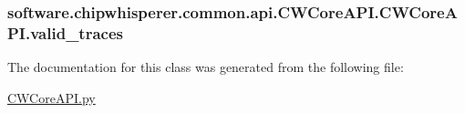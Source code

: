 \subsubsection[{valid\+\_\+traces}]{\setlength{\rightskip}{0pt plus 5cm}software.\+chipwhisperer.\+common.\+api.\+C\+W\+Core\+A\+P\+I.\+C\+W\+Core\+A\+P\+I.\+valid\+\_\+traces}\label{classsoftware_1_1chipwhisperer_1_1common_1_1api_1_1CWCoreAPI_1_1CWCoreAPI_a9b826e94323e65d1d9731dc1231d69f9}


The documentation for this class was generated from the following file\+:\begin{DoxyCompactItemize}
\item 
\hyperlink{CWCoreAPI_8py}{C\+W\+Core\+A\+P\+I.\+py}\end{DoxyCompactItemize}
